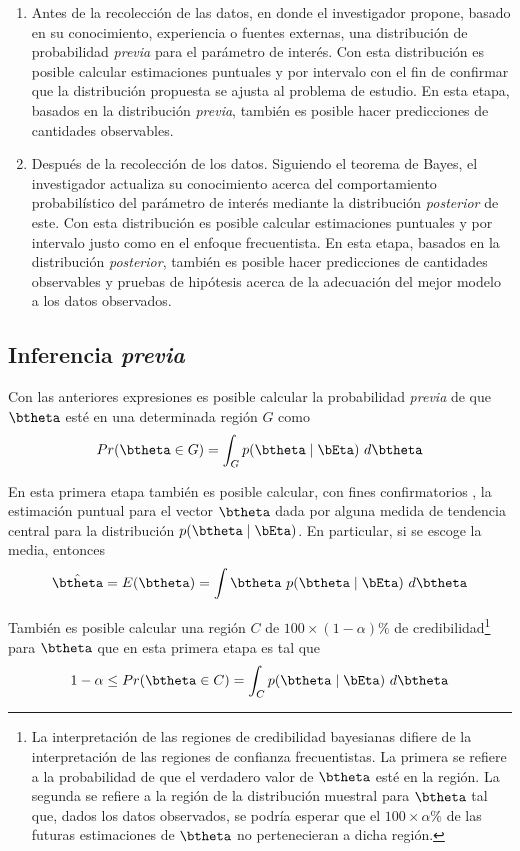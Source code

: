 \documentclass[10pt,openright]{book}\usepackage[]{graphicx}\usepackage[]{color}
\begin{document}
\begin{enumerate}
  \item Antes de la recolección de las datos, en donde el investigador propone, basado en su conocimiento, experiencia o fuentes externas, una distribución de probabilidad \emph{previa} para el parámetro de interés. Con esta distribución es posible calcular estimaciones puntuales y por intervalo con el fin de confirmar que la distribución propuesta se ajusta al problema de estudio. En esta etapa, basados en la distribución \emph{previa}, también es posible hacer predicciones de cantidades observables.
  \item Después de la recolección de los datos. Siguiendo el teorema de Bayes, el investigador actualiza su conocimiento acerca del comportamiento probabilístico del parámetro de interés mediante la distribución \emph{posterior} de este. Con esta distribución es posible calcular estimaciones puntuales y por intervalo justo como en el enfoque frecuentista. En esta etapa, basados en la distribución \emph{posterior}, también es posible hacer predicciones de cantidades observables y pruebas de hipótesis acerca de la adecuación del mejor modelo a los datos observados.
\end{enumerate}

\subsection{Inferencia \emph{previa}}

Con las anteriores expresiones es posible calcular la probabilidad \emph{previa} de que $\btheta$ esté en una determinada región $G$ como
\begin{equation}
Pr(\btheta\in G)=\int_G p(\btheta \mid \bEta)\ d\btheta
\end{equation}

En esta primera etapa también es posible calcular, con fines confirmatorios \cite{Carlin96}, la estimación puntual para el vector $\btheta$ dada por alguna medida de tendencia central para la distribución $p(\btheta \mid \bEta)$. En particular, si se escoge la media, entonces
\begin{equation}\label{est.prio}
\hat{\btheta}=E(\btheta)=\int \btheta \ p(\btheta \mid \bEta)\ d\btheta
\end{equation}

También es posible calcular una región $C$ de $100\times(1-\alpha)\%$ de credibilidad\footnote{La interpretación de las regiones de credibilidad bayesianas difiere de la interpretación de las regiones de confianza frecuentistas. La primera se refiere a la probabilidad de que el verdadero valor de $\btheta$ esté en la región. La segunda se refiere a la región de la distribución muestral para $\btheta$ tal que, dados los datos observados, se podría esperar que el $100\times\alpha\%$ de las futuras estimaciones de $\btheta$ no pertenecieran a dicha región.} para $\btheta$ que en esta primera etapa es tal que
\begin{equation}
1-\alpha \leq Pr(\btheta \in C)=\int_Cp(\btheta \mid \bEta)\ d\btheta
\end{equation}
\end{document}
